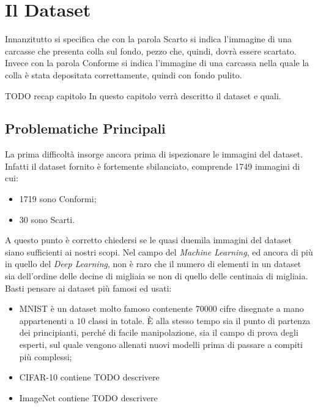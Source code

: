 
\chapter{Il Dataset}

Innanzitutto si specifica che con la parola Scarto si indica l'immagine di una carcasse che presenta colla sul fondo, pezzo che, quindi, dovrà essere scartato.
Invece con la parola Conforme si indica l'immagine di una carcassa nella quale la colla è stata depositata correttamente, quindi con fondo pulito.

TODO recap capitolo
In questo capitolo verrà descritto il dataset e quali.


\section{Problematiche Principali}

La prima difficoltà insorge ancora prima di ispezionare le immagini del dataset.
Infatti il dataset fornito è fortemente sbilanciato, comprende 1749 immagini di cui:
\begin{itemize}
    \item 1719 sono Conformi;
    \item 30 sono Scarti.
\end{itemize}

A questo punto è corretto chiedersi se le quasi duemila immagini del dataset siano sufficienti ai nostri scopi.
Nel campo del \textit{Machine Learning}, ed ancora di più in quello del \textit{Deep Learning}, non è raro che il numero di elementi in un dataset sia dell'ordine delle decine di migliaia se non di quello delle centinaia di migliaia.
Basti pensare ai dataset più famosi ed usati:
\begin{itemize}
  \item MNIST è un dataset molto famoso contenente $70000$ cifre disegnate a mano appartenenti a $10$ classi in totale.
    È alla stesso tempo sia il punto di partenza dei principianti, perché di facile manipolazione, sia il campo di prova degli esperti, sul quale vengono allenati nuovi modelli prima di passare a compiti più complessi;
  \item CIFAR-10 contiene TODO descrivere 
  \item ImageNet contiene TODO descrivere 
\end{itemize}

